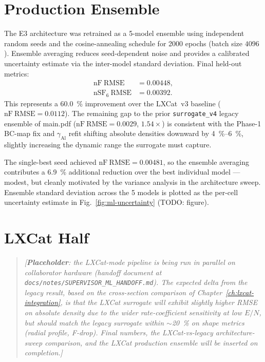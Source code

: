 \section{Production Ensemble}
\label{sec:ml-production-ensemble}

The E3 architecture was retrained as a 5-model ensemble using independent
random seeds and the cosine-annealing schedule for \num{2000} epochs (batch
size $4096$). Ensemble averaging reduces seed-dependent noise and provides a
calibrated uncertainty estimate via the inter-model standard deviation. Final
held-out metrics:
\begin{align}
  \mathrm{nF\ RMSE}        &= \mathbf{0.00448}, \\
  \mathrm{nSF}_6\ \mathrm{RMSE} &= \mathbf{0.00392}.
\end{align}
This represents a \SI{60.0}{\percent} improvement over the LXCat~v3 baseline
($\mathrm{nF}\ \mathrm{RMSE}=0.0112$). The remaining gap to the prior
\texttt{surrogate\_v4} legacy ensemble of main.pdf
($\mathrm{nF}\ \mathrm{RMSE}=0.0029$, $1.54\times$) is consistent with the
Phase-1 BC-map fix and $\gamma_\mathrm{Al}$ refit shifting absolute densities
downward by \SIrange{4}{6}{\percent}, slightly increasing the dynamic range
the surrogate must capture.

The single-best seed achieved $\mathrm{nF}\ \mathrm{RMSE}=0.00481$, so the
ensemble averaging contributes a \SI{6.9}{\percent} additional reduction over
the best individual model — modest, but cleanly motivated by the variance
analysis in the architecture sweep. Ensemble standard deviation across the
5 models is plotted as the per-cell uncertainty estimate in
Fig.~\ref{fig:ml-uncertainty} (TODO: figure).

\section{LXCat Half}
\label{sec:ml-lxcat}

\begin{quote}\itshape
[\textbf{Placeholder}: the LXCat-mode pipeline is being run in parallel on
collaborator hardware (handoff document at
\texttt{docs/notes/SUPERVISOR\_ML\_HANDOFF.md}). The expected delta from
the legacy result, based on the cross-section comparison of
Chapter~\ref{ch:lxcat-integration}, is that the LXCat surrogate will exhibit
slightly higher RMSE on absolute density due to the wider rate-coefficient
sensitivity at low $E/N$, but should match the legacy surrogate within
$\sim$\SI{20}{\percent} on shape metrics (radial profile, F-drop). Final
numbers, the LXCat-vs-legacy architecture-sweep comparison, and the LXCat
production ensemble will be inserted on completion.]
\end{quote}

